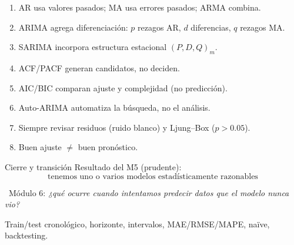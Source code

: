 \begin{frame}
\begin{recordar}
\begin{enumerate}
  \item AR usa valores pasados; MA usa errores pasados; ARMA combina.
  \item ARIMA agrega diferenciación: $p$ rezagos AR, $d$ diferencias, $q$ rezagos MA.
  \item SARIMA incorpora estructura estacional $(P,D,Q)_m$.
  \item ACF/PACF generan candidatos, no deciden.
  \item AIC/BIC comparan ajuste y complejidad (no predicción).
  \item Auto-ARIMA automatiza la búsqueda, no el análisis.
  \item Siempre revisar residuos (ruido blanco) y Ljung--Box ($p>0.05$).
  \item Buen ajuste $\neq$ buen pronóstico.
\end{enumerate}
\end{recordar}
\end{frame}

\begin{frame}{Cierre y transición}
Resultado del M5 (prudente):
\[
\boxed{\text{tenemos uno o varios modelos estadísticamente razonables}}
\]
\begin{center}
\fl\ Módulo 6: \emph{¿qué ocurre cuando intentamos predecir datos que el modelo nunca vio?}
\end{center}
Train/test cronológico, horizonte, intervalos, MAE/RMSE/MAPE, naïve, backtesting.
\end{frame}


